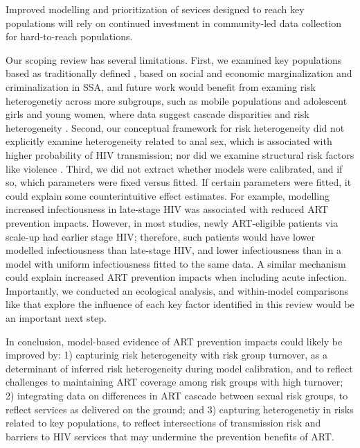 Improved modelling and prioritization of sevices designed to reach key populations
will rely on continued investment in community-led data collection for hard-to-reach populations.
\par
Our scoping review has several limitations.
First, we examined key populations based as traditionally defined \cite{WHO2016KP},
based on social and economic marginalization and criminalization in SSA,
and future work would benefit from examing risk heterogenetiy across more subgroups,
such as mobile populations and adolescent girls and young women,
where data suggest cascade disparities and risk heterogeneity \cite{Tanser2015,Dellar2015}.
Second, our conceptual framework for risk heterogeneity did not explicitly examine
heterogeneity related to anal sex, which is associated with higher probability of HIV transmission;
nor did we examine structural risk factors like violence \cite{Silverman2011,Baggaley2013}.
Third, we did not extract whether models were calibrated,
and if so, which parameters were fixed versus fitted.
If certain parameters were fitted, it could explain some counterintuitive effect estimates.
For example, modelling increased infectiousness in late-stage HIV
was associated with reduced ART prevention impacts.
However, in most studies, newly ART-eligible patients via scale-up had earlier stage HIV;
therefore, such patients would have lower modelled infectiousness than late-stage HIV,
and lower infectiousness than in a model with uniform infectiousness fitted to the same data.
A similar mechanism could explain increased ART prevention impacts when including acute infection.
Importantly, we conducted an ecological analysis,
and within-model comparisons like \cite{Dodd2010,Hontelez2013} that explore
the influence of each key factor identified in this review would be an important next step.
\par
In conclusion, model-based evidence of ART prevention impacts could likely be improved by:
1) capturinig risk heterogeneity with risk group turnover,
   as a determinant of inferred risk heterogeneity during model calibration, and
   to reflect challenges to maintaining ART coverage among risk groups with high turnover;
2) integrating data on differences in ART cascade between sexual risk groups,
   to reflect services as delivered on the ground; and
3) capturing heterogenetiy in risks related to key populations,
   to reflect intersections of transmission risk and barriers to HIV services
   that may undermine the prevention benefits of ART.
